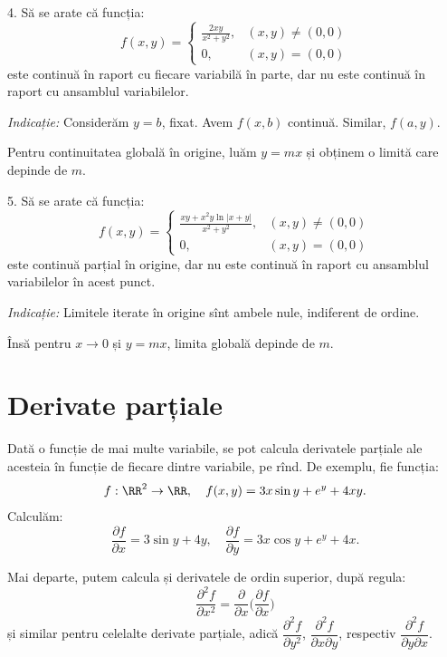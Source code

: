 \vspace{1cm}

4. Să se arate că funcția:
\[
  f(x, y) = \begin{cases}
    \frac{2xy}{x^2 + y^2}, & (x, y) \neq (0, 0) \\
    0, & (x, y) = (0, 0)
  \end{cases}
\]
este continuă în raport cu fiecare variabilă în parte, dar nu este continuă în raport
cu ansamblul variabilelor.

\emph{Indicație:} Considerăm $y = b$, fixat. Avem $f(x, b)$ continuă. Similar, $f(a, y)$.

Pentru continuitatea globală în origine, luăm $y = mx$ și obținem o limită care depinde de $m$.

\vspace{1cm}

5. Să se arate că funcția:
\[
  f(x, y) = \begin{cases}
    \frac{xy + x^2 y \ln |x + y|}{x^2 + y^2}, & (x, y) \neq (0, 0) \\
    0, & (x, y) = (0, 0)
  \end{cases}
\]
este continuă parțial în origine, dar nu este continuă în raport cu ansamblul
variabilelor în acest punct.

\emph{Indicație:} Limitele iterate în origine sînt ambele nule, indiferent de ordine.

Însă pentru $x \to 0$ și $y = mx$, limita globală depinde de $m$.


\section{Derivate parțiale}

Dată o funcție de mai multe variabile, se pot calcula derivatele parțiale ale
acesteia în funcție de fiecare dintre variabile, pe rînd. De exemplu,
fie funcția:
\[
  f : \RR^2 \to \RR, \quad f(x, y) = 3x \sin y + e^y + 4xy.
\]
Calculăm:
\[
  \frac{\partial f}{\partial x} = 3 \sin y + 4y, \quad %
  \frac{\partial f}{\partial y} = 3x\cos y + e^y + 4x.
\]

Mai departe, putem calcula și derivatele de ordin superior, după
regula:
\[
  \frac{\partial^2 f}{\partial x^2} = \frac{\partial}{\partial x} %
  \Big( \frac{\partial f}{\partial x} \Big)
\]
și similar pentru celelalte derivate parțiale, adică $ \dfrac{\partial^2 f}{\partial y^2} $,
$ \dfrac{\partial^2 f}{\partial x \partial y} $, respectiv
$ \dfrac{\partial^2 f}{\partial y \partial x} $.

